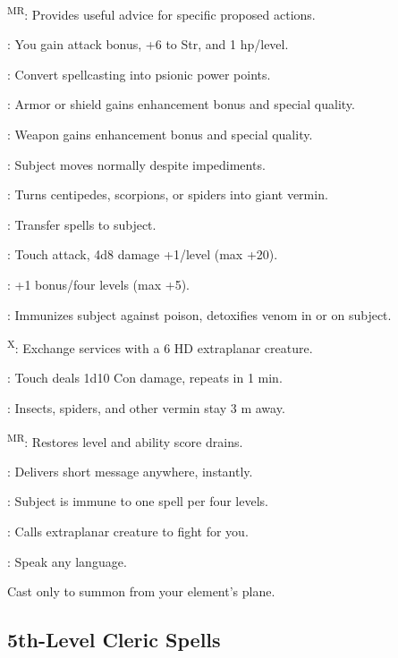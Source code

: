 \textsuperscript{MR}: Provides useful advice for specific proposed actions.

: You gain attack bonus, +6 to Str, and 1 hp/level.

: Convert spellcasting into psionic power points.

: Armor or shield gains enhancement bonus and special quality. %

: Weapon gains enhancement bonus and special quality. %

: Subject moves normally despite impediments.

: Turns centipedes, scorpions, or spiders into giant vermin.

: Transfer spells to subject.

: Touch attack, 4d8 damage +1/level (max +20).

: +1 bonus/four levels (max +5).

: Immunizes subject against poison, detoxifies venom in or on subject.

\textsuperscript{X}: Exchange services with a 6 HD extraplanar creature.

: Touch deals 1d10 Con damage, repeats in 1 min.

: Insects, spiders, and other vermin stay 3 m away.

\textsuperscript{MR}: Restores level and ability score drains.

: Delivers short message anywhere, instantly.

: Subject is immune to one spell per four levels.

\footnotemark[1]: Calls extraplanar creature to fight for you.

: Speak any language.

 Cast only to summon from your element's plane.



\subsection{5th-Level Cleric Spells}

